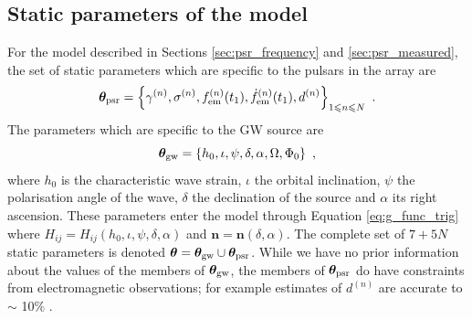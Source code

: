\documentclass[fleqn,usenatbib,useAMS]{mnras}
\begin{document}
\subsection{Static parameters of the model}\label{sec:ss_params}
For the model described in Sections \ref{sec:psr_frequency} and \ref{sec:psr_measured}, the set of static parameters which are specific to the pulsars in the array are
\begin{equation}
	\boldsymbol{\theta}_{\rm psr} = \left \{ \gamma^{(n)},\sigma^{(n)}, f_{\rm em}^{(n)}(t_1),\dot{f}_{\rm em}^{(n)}(t_1),d^{(n)}\right\}_{1\leq n \leq N} \ .  \label{eq:psrparams}
\end{equation}
The parameters which are specific to the GW source are 
\begin{equation}
	\boldsymbol{\theta}_{\rm gw} = \left \{h_0, \iota, \psi, \delta, \alpha, \Omega, \Phi_0 \right \} \ ,  \label{eq:params3}
\end{equation}
where $h_0$ is the characteristic wave strain, $\iota$ the orbital inclination, $\psi$ the polarisation angle of the wave, $\delta$ the declination of the source and $\alpha$ its right ascension. These parameters enter the model through Equation \eqref{eq:g_func_trig} where $H_{ij} = H_{ij}(h_0, \iota, \psi, \delta, \alpha)$ and $\boldsymbol{n}=\boldsymbol{n}(\delta,\alpha)$. The complete set of $7 + 5N$ static parameters is denoted $\boldsymbol{\theta} = \boldsymbol{\theta}_{\rm gw} \cup \boldsymbol{\theta}_{\rm psr}$. While we have no prior information about the values of the members of $\boldsymbol{\theta}_{\rm gw}$, the members of $\boldsymbol{\theta}_{\rm psr}$
do have constraints from electromagnetic observations; for example estimates of $d^{(n)}$ are accurate to $\sim$ 10$\%$ \citep{Cordes2002astro.ph..7156C, Verbiest2012ApJ...755...39V, Desvignes2016,Yao2017}.
\end{document}
